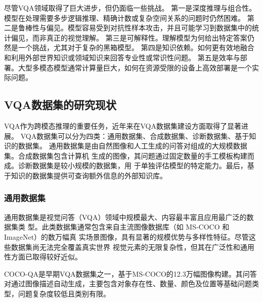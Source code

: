 尽管VQA领域取得了巨大进步，但仍面临一些挑战。
第一是深度推理与组合性。模型在处理需要多步逻辑推理、精确计数或复杂空间关系的问题时仍然困难。
第二是鲁棒性与偏见。模型容易受到对抗性样本攻击，并且可能学习到数据集中的统计偏见，而非真正的视觉理解。
第三是可解释性。理解模型为何给出特定答案仍然是一个挑战，尤其对于复杂的黑箱模型。
第四是知识依赖。如何更有效地融合和利用外部世界知识或领域知识来回答专业性或常识性问题。
第五是效率与部署。大型多模态模型通常计算量巨大，如何在资源受限的设备上高效部署是一个实际问题。
\subsection{VQA数据集的研究现状}
VQA作为跨模态推理的重要任务，近年来在VQA数据集建设方面取得了显著进展。
VQA数据集可以分为四类：通用数据集、合成数据集、诊断数据集、基于知识的数据集。
通用数据集是由自然图像和人工生成的问答对组成的大规模数据集。合成数据集包含计算机
生成的图像，其问题通过固定数量的手工模板构建而成。诊断数据集是较小规模的数据集，用
于单独评估模型的特定能力。最后，基于知识的数据集提供可查询额外信息的外部知识库。
\subsubsection{通用数据集}
通用数据集是视觉问答（VQA）领域中规模最大、内容最丰富且应用最广泛的数据集类
型。此类数据集通常包含来自主流图像数据库（如 MS-COCO\cite{lin2014microsoft} 和 ImageNet\cite{deng2009imagenet}）的数万幅真
实场景图像，具有显著的规模优势与多样性特征。尽管这些数据集尚无法完全覆盖真实世界
视觉元素的无限复杂性，但其在广泛性和通用性方面已取得较好近似。

COCO-QA是早期VQA数据集之一，基于MS-COCO的12.3万幅图像构建。其问答对通过图像描述自动生成，主要包含对象存在性、数量、颜色及位置等基础问题类型，问题复杂度较低且类别有限。


